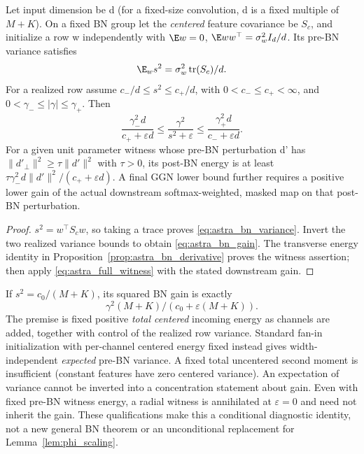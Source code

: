 \begin{proposition}
\label{prop:astra_bn_gain}
Let input dimension be d (for a fixed-size convolution, d is a fixed
multiple of $M+K$). On a fixed BN group let the \emph{centered} feature
covariance be $S_c$, and initialize a row w independently with
$\E w=0$, $\E ww^\top=\sigma_w^2 I_d/d$. Its pre-BN variance satisfies
\begin{equation}\label{eq:astra_bn_variance}
 \E_w s^2=\sigma_w^2\operatorname{tr}(S_c)/d.
\end{equation}
For a realized row assume $c_-/d\le s^2\le c_+/d$, with
$0<c_-\le c_+<\infty$, and
$0<\gamma_-\le|\gamma|\le\gamma_+$. Then
\begin{equation}\label{eq:astra_bn_gain}
 \frac{\gamma_-^2d}{c_++\varepsilon d}
 \le\frac{\gamma^2}{s^2+\varepsilon}
 \le\frac{\gamma_+^2d}{c_-+\varepsilon d}.
\end{equation}
For a given unit parameter witness whose pre-BN perturbation d' has
$\|d'_\perp\|^2\ge\tau\|d'\|^2$ with $\tau>0$, its post-BN energy
is at least
$\tau\gamma_-^2d\|d'\|^2/(c_++\varepsilon d)$.
A final GGN lower bound further requires a positive lower gain of the
actual downstream softmax-weighted, masked map on that post-BN perturbation.
\end{proposition}
\begin{proof}
$s^2=w^\top S_cw$, so taking a trace proves
\eqref{eq:astra_bn_variance}. Invert the two realized variance bounds
to obtain \eqref{eq:astra_bn_gain}. The transverse energy identity in
Proposition~\ref{prop:astra_bn_derivative} proves the witness assertion;
then apply \eqref{eq:astra_full_witness} with the stated downstream gain.
\end{proof}
\begin{remark}
If $s^2=c_0/(M+K)$, its squared BN gain is exactly
\[
 \gamma^2(M+K)/(c_0+\varepsilon(M+K)).
\]
The premise is fixed positive \emph{total centered} incoming energy as
channels are added, together with control of the realized row variance.
Standard fan-in initialization with per-channel centered energy fixed
instead gives width-independent \emph{expected} pre-BN variance.
A fixed total uncentered second moment is insufficient (constant
features have zero centered variance). An expectation of variance cannot
be inverted into a concentration statement about gain. Even with fixed
pre-BN witness energy, a radial witness is annihilated at
$\varepsilon=0$ and need not inherit the gain. These qualifications
make this a conditional diagnostic identity, not a new general BN theorem
or an unconditional replacement for Lemma~\ref{lem:phi_scaling}.
\end{remark}
